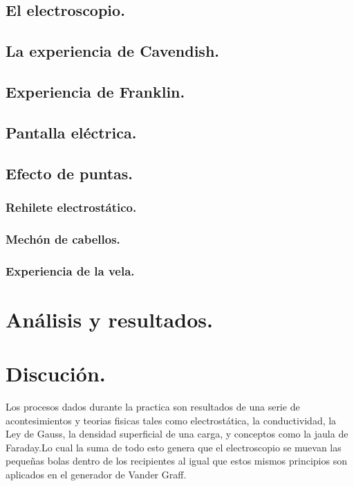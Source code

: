\documentclass[10pt]{article}
\begin{document}
\begin{multicols}{2}
\subsection{El electroscopio.}

\subsection{La experiencia de Cavendish.}

\subsection{Experiencia de Franklin.}

\subsection{Pantalla eléctrica.}

\subsection{Efecto de puntas.}

\subsubsection{Rehilete electrostático.}

\subsubsection{Mechón de cabellos.}

\subsubsection{Experiencia de la vela.}



\section{Análisis y resultados.}

\section{Discución.}
Los procesos dados durante la practica son resultados de una serie de acontesimientos y teorias fisicas tales como electrostática, la conductividad, la Ley de Gauss, la densidad superficial de una carga, y conceptos como la jaula de Faraday.Lo cual la suma de todo esto genera que el electroscopio se muevan las pequeñas bolas dentro de los recipientes al igual que estos mismos principios son aplicados en el generador de Vander Graff. 


\end{multicols}
\end{document}
